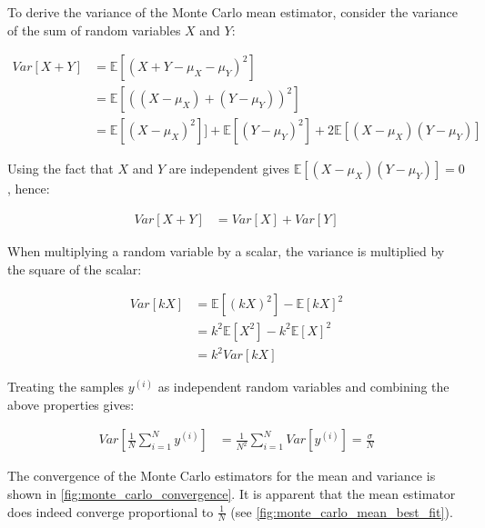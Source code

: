 \documentclass[a4paper]{article}
\begin{document}
To derive the variance of the Monte Carlo mean estimator, consider the variance of the sum of random variables $X$ and
$Y$:

\begin{align*}
    Var[X+Y]
    &= \mathbb{E}\left[(X + Y - \mu_X - \mu_Y)^2\right] \\
    &= \mathbb{E}\left[((X - \mu_X) + (Y - \mu_Y))^2\right] \\
    &= \mathbb{E}\left[(X-\mu_X)^2\right]] + \mathbb{E}\left[(Y-\mu_Y)^2\right] + 2\mathbb{E}\left[(X-\mu_X)(Y-\mu_Y)\right]
\end{align*}

Using the fact that $X$ and $Y$ are independent gives $\mathbb{E}\left[(X-\mu_X)(Y-\mu_Y)\right] = 0$, hence:

\begin{align*}
    Var[X+Y] & = Var[X] + Var[Y]
\end{align*}

When multiplying a random variable by a scalar, the variance is multiplied by the square of the scalar:

\begin{align*}
    Var[kX]
    &= \mathbb{E}\left[(kX)^2\right] - \mathbb{E}[kX]^2 \\
    &= k^2 \mathbb{E}\left[X^2\right] - k^2\mathbb{E}[X]^2 \\
    &= k^2 Var[kX]
\end{align*}

Treating the samples $y^{(i)}$ as independent random variables and combining the above properties gives:

\begin{align*}
    Var\left[ \frac{1}{N}\sum_{i=1}^N y^{(i)} \right] &= \frac{1}{N^2} \sum_{i=1}^N Var\left[y^{(i)}\right] = \frac{\sigma}{N}
\end{align*}

The convergence of the Monte Carlo estimators for the mean and variance is shown in \autoref{fig:monte_carlo_convergence}.
It is apparent that the mean estimator does indeed converge proportional to $\frac{1}{N}$
(see \autoref{fig:monte_carlo_mean_best_fit}).
\end{document}
